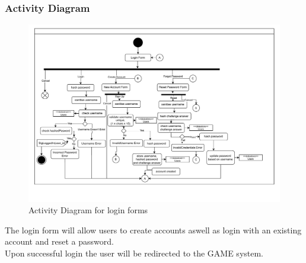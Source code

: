 \documentclass{article}
\begin{document}
        \subsubsection{Activity Diagram}
        \begin{figure}[H]
                \centering
                \includegraphics[width=\textwidth, trim = 0 50 0 0, clip]{images/design/Login_System.pdf}
                \caption{Activity Diagram for login forms}
                \label{fig:ie_2}
        \end{figure}
        The login form will allow users to create accounts aswell as login with an existing account and reset a password.\\
        Upon successful login the user will be redirected to the GAME system.\\
        \newpage
\end{document}
